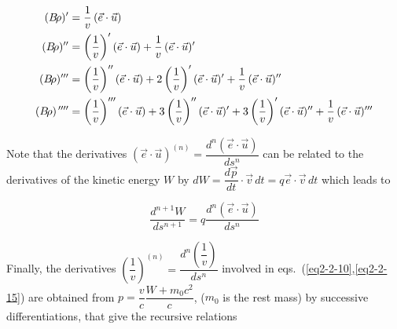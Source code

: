 \begin{equation}
	\begin{aligned}
		(B\!\rho )^\prime 
		      & =  \dfrac{ 1 }{ v}\, (\vec  e \cdot \vec  u) \\
		(B\!\rho)^{\prime\prime}
		      & =  \left(\dfrac{1 }{ v}\right)^\prime
		        (\vec  e \cdot \vec  u) +
		        \dfrac{1 }{ v}\, (\vec  e\cdot\vec  u)^\prime \\
		(B\!\rho )^{\prime\prime\prime}
		      & =  \left(\dfrac{1 }{ v}\right)^{\prime\prime} (\vec  e\cdot\vec  u)
		        +2\left(\dfrac{1 }{v}\right)^\prime (\vec  e\cdot\vec  u)^\prime 
		        +\dfrac{1 }{ v}\, (\vec  e\cdot\vec u)^{\prime\prime} \\
	    (B\!\rho )^{\,\prime\prime\prime\prime} 
	          & =  \left(\dfrac{1 }{v}\right)^{\prime\prime\prime} (\vec  e\cdot\vec  u)
	            +3\left(\dfrac{1 }{ v}\right)^{\prime\prime}(\vec  e\cdot\vec  u)^\prime 
	            +3\left(\dfrac{1 }{ v}\right)^\prime (\vec  e\cdot\vec u)^{\prime\prime} 
	            + \dfrac{1 }{ v}\, (\vec  e\cdot\vec  u)^{\prime\prime\prime}
	\end{aligned}
	\label{eq2-2-15}
\end{equation}

\noindent Note that the derivatives $ (\vec  e \cdot \vec  u)^{(n)} = 
\dfrac{ d^n(\vec e\cdot\vec  u) }{ ds^n} $ can be related to the derivatives of the 
kinetic energy $ W $ by $dW = \dfrac{d\vec  p }{ dt} \cdot\vec  v\, dt = q\vec  e\cdot\vec  v\, dt $
which leads to

\begin{equation}
	\dfrac{ d^{n+1}W }{ds^{n+1}} = q \dfrac{ d^n (\vec  e\cdot\vec  u) }{ ds^n}
	\label{eq2-2-16}
\end{equation}


\noindent Finally, the derivatives $ \left(\dfrac{ 1 }{ v}\right)^{(n)} =
\dfrac{ d^n \left(\dfrac{1 }{ v}\right) }{ ds^n} $ involved in 
eqs.~(\ref{eq2-2-10},\ref{eq2-2-15}) are 
obtained from $ p=\dfrac{ v }{ c} \dfrac{ W+m_0 c^2 }{ c} $,
 ($m_0$ is the rest mass) by successive differentiations, that give the recursive relations

